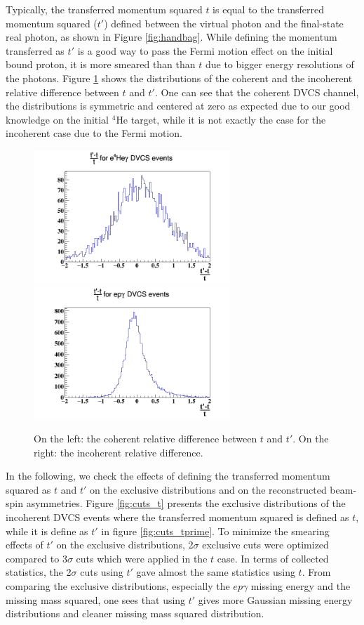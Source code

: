\documentclass[a4paper,11pt,twoside]{article}
\begin{document}
Typically, the transferred momentum squared $t$ is equal to the transferred 
momentum squared ($t'$) defined between the virtual photon and the final-state 
real photon, as shown in Figure \ref{fig:handbag}.  While defining the momentum 
transferred as $t'$ is a good way to pass the Fermi motion effect on the 
initial bound proton, it is more smeared than than $t$ due to bigger energy 
resolutions of the photons. Figure \ref{fig:tprime} shows the distributions of 
the coherent and the incoherent relative difference between $t$ and $t'$. One 
can see that the coherent DVCS channel, the distributions is symmetric and 
centered at zero as expected due to our good knowledge on the initial $^4$He 
target, while it is not exactly the case for the incoherent case due to the 
Fermi motion.\\            

\begin{figure}[h!]
\includegraphics[height=5.0cm]{fig/T_tprime_Coh.png}
\includegraphics[height=5.0cm]{fig/T_tprime_InCoh.png}
\caption{On the left: the coherent relative difference between $t$ and $t'$.  
On the right: the incoherent relative difference.}
\label{fig:tprime}
\end{figure}

In the following, we check the effects of defining the transferred momentum 
squared as $t$ and $t'$ on the exclusive distributions and on the reconstructed 
beam-spin asymmetries. Figure \ref{fig:cuts_t} presents the exclusive 
distributions of the incoherent DVCS events where the transferred momentum
squared is defined as $t$, while it is define as $t'$ in figure 
\ref{fig:cuts_tprime}. To minimize the smearing effects of $t'$ on the 
exclusive distributions, 2$\sigma$ exclusive cuts were optimized compared to 
3$\sigma$ cuts which were applied in the $t$ case. In terms of collected 
statistics, the 2$\sigma$ cuts using $t'$ gave almost the same statistics using 
$t$. From comparing the exclusive distributions, especially the $ep\gamma$ 
missing energy and the missing mass squared, one sees that using $t'$ gives 
more Gaussian missing energy distributions and cleaner missing mass squared 
distribution.\\      
\end{document}
